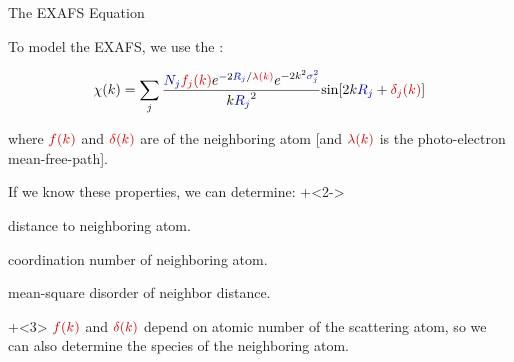 \begin{slide}{The EXAFS Equation}


  \begin{cenpage}{120mm}

    To model the EXAFS, we use the {}:
  \vspace{-1mm}

  \begin{center}
    \[ \chi(k) = \sum_j {\frac{{\Blue{N_j}} {\Red{f_j(k)}}
        e^{-2{\Blue{R_j}}/{\Red{\lambda(k)}}}
        e^{-2k^2{\Blue{\sigma_j^2}}}}{k{\Blue{R_j}}^2}
      {\sin[{2k{\Blue{R_j}} + {\Red{\delta_j(k)}}] }}} \]
  \end{center}

  \vmm

  where $\Red{f(k)}$ and $\Red{\delta(k)}$ are
  {} of the neighboring
  atom [and $ \Red{\lambda(k)} $ is the photo-electron mean-free-path].

  \vmm
  If we know these properties, we can determine:
  \onslide+<2->
    \begin{description}
      \settowidth{\labelwidth}{15mm}
      \setlength{\itemindent}{15mm}
      \setlength{\leftmargin}{15mm}
    \item[$R$] distance to neighboring atom.
    \item[$N$] coordination number of neighboring atom.
    \item[$\sigma^2$] mean-square disorder of neighbor distance.
    \end{description}

  \vmm
  \onslide+<3>
  ${\Red{f(k)}}$ and ${\Red{\delta(k)}}$ depend on atomic number
  {} of the scattering atom, so we can also determine the
  species of the neighboring atom.


\end{cenpage}

\end{slide}

